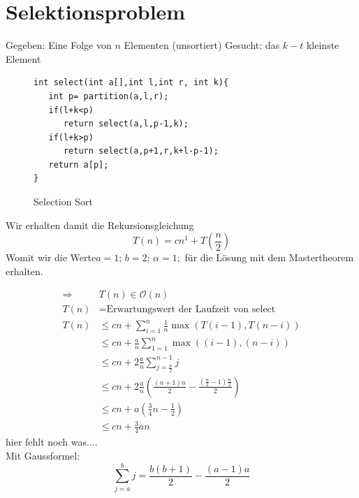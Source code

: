 \documentclass[a4paper,twoside,10pt]{report}
\begin{document}
{\section{Selektionsproblem}
Gegeben: Eine Folge von $n$ Elementen (unsortiert)
Gesucht: das $k-t$ kleinste Element
\begin{figure}[H]
\begin{verbatim}
int select(int a[],int l,int r, int k){
   int p= partition(a,l,r);
   if(l+k<p) 
      return select(a,l,p-1,k);
   if(l+k>p) 
      return select(a,p+1,r,k+l-p-1);
   return a[p];
}
\end{verbatim}
\caption{Selection Sort}
\end{figure}
Wir erhalten damit die Rekursionsgleichung
\[T(n)=cn^1+T(\frac{n}{2})\]
Womit wir die Werte$a=1;\, b=2;\,\alpha=1;$ für die Lösung mit dem Mastertheorem erhalten.

\begin{align*}
\Rightarrow& T(n)\in \mathcal O(n)\\
T(n)&=\mbox{Erwartungswert der Laufzeit von select}\\
T(n)&\le cn+\sum_{i=1}^n\frac{1}{n}\max\left(T(i-1),T(n-i)\right)\\
&\le cn+\frac{a}{n}\sum_{1=1}^n\max\left((i-1),(n-i)\right)\\
&\le cn+2\frac{a}{n}\sum_{j=\frac{n}{2}}^{n-1}j\\
&\le cn+2\frac{a}{n}\left(\frac{(n+1)n}{2}-\frac{(\frac{n}{2}-1)\frac{n}{2}}{2}\right)\\
&\le cn+a\left(\frac{3}{4}n-\frac{1}{2}\right)\\
&\le cn+\frac{3}{4}an
\end{align*}
hier fehlt noch was....\\
Mit Gaussformel:
$$\sum_{j=a}^bj=\frac{b(b+1)}{2}- \frac{(a-1)a}{2}$$
}
\end{document}
